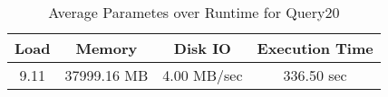 \documentclass[../../main.tex]{subfiles}
\begin{document}
    \begin{table}
        \begin{center}
            \begin{tabular}{ |c|c|c|c| } 
            \hline
            Load & Memory & Disk IO & Execution Time\\
            \hline
            9.11 & 37999.16 MB & 4.00 MB/sec & 336.50 sec \\
            \hline
            \end{tabular}
            \\[1pt]
            \caption{Average Parametes over Runtime for Query20}
        \end{center}
    \end{table}
    \pagebreak
\end{document}
